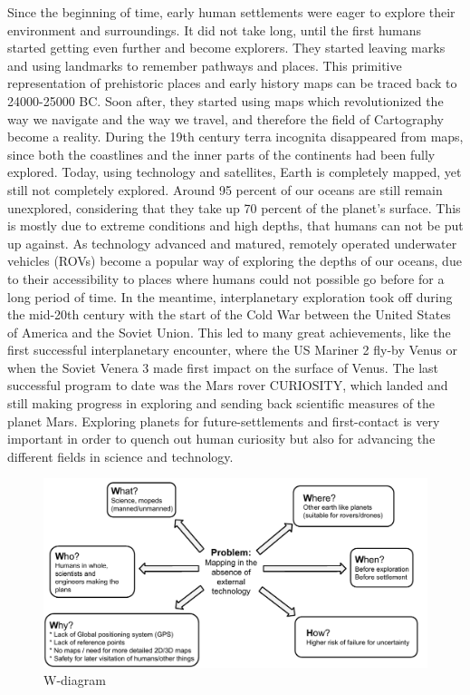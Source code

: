 Since the beginning of time, early human settlements were eager to explore their environment and surroundings. It did not take long, until the first humans started getting even further and become explorers. They started leaving marks and using landmarks to remember pathways and places. This primitive representation of prehistoric places and early history maps can be traced back to 24000-25000 BC\cite{cavedrawings}. Soon after, they started using maps which revolutionized the way we navigate and the way we travel, and therefore the field of Cartography become a reality. During the 19th century terra incognita disappeared from maps, since both the coastlines and the inner parts of the continents had been fully explored. Today, using technology and satellites, Earth is completely mapped, yet still not completely explored. Around 95 percent of our oceans are still remain unexplored, considering that they take up 70 percent of the planet's surface\cite{oceandepth}. This is mostly due to extreme conditions and high depths, that humans can not be put up against. As technology advanced and matured, remotely operated underwater vehicles (ROVs) become a popular way of exploring the depths of our oceans, due to their accessibility to places where humans could not possible go before for a long period of time. In the meantime, interplanetary exploration took off during the mid-20th century with the start of the Cold War between the United States of America and the Soviet Union. This led to many great achievements, like the first successful interplanetary encounter, where the US Mariner 2 fly-by Venus\cite{firstflyby} or when the Soviet Venera 3 made first impact on the surface of Venus\cite{firstimpact}. The last successful program to date was the Mars rover CURIOSITY, which landed and still making progress in exploring and sending back scientific measures of the planet Mars. Exploring planets for future-settlements and first-contact is very important in order to quench out human curiosity but also for advancing the different fields in science and technology.

\clearpage

\begin{figure}[!h]
	\centering
	\includegraphics[scale=.7]{images/wdiagram1.pdf}
	\caption{W-diagram}
	\label{fig:wdiagram}
\end{figure}

